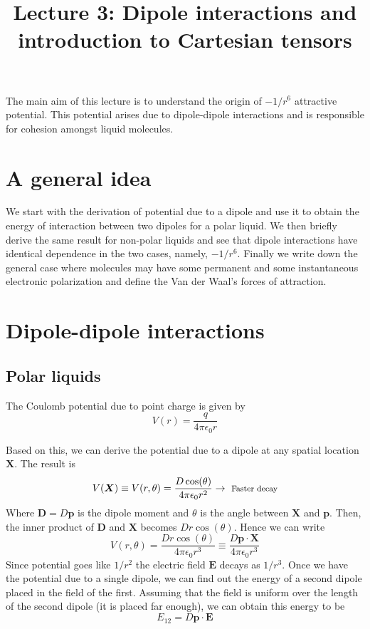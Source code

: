 \documentclass[11pt, letterpaper]{article}
\title{Lecture 3: Dipole interactions and introduction to Cartesian tensors}
\begin{document}
\maketitle

The main aim of this lecture is to understand the origin of $-1/r^6$ attractive potential. This potential arises due to dipole-dipole interactions and is responsible for cohesion amongst liquid molecules.

\section{A general idea}
We start with the derivation of potential due to a dipole and use it to obtain the energy of interaction between two dipoles for a polar liquid. We then briefly derive the same result for non-polar liquids and see that dipole interactions have identical dependence in the two cases, namely, $-1/r^6$. Finally we write down the general case where molecules may have some permanent and some instantaneous electronic polarization and define the Van der Waal's forces of attraction.

\section{Dipole-dipole interactions}
\subsection{Polar liquids}

The Coulomb potential due to point charge is given by 
$$
V(r)=\frac{q}{4\pi\epsilon_0 r}
$$

Based on this, we can derive the potential due to a dipole at any spatial location $\bm{X}$. The result is
$$
V(\bm{X})\equiv V({r,\theta}) =\frac{D \cos(\theta)}{4\pi\epsilon_0 r^2} \rightarrow\text{ \footnotesize{Faster decay}}
$$
Where $\bm{D}=D\bm{p}$ is the dipole moment and $\theta$ is the angle between $\bm{X}$ and $\bm{p}$. Then, the inner product of $\bm{D}$ and $\bm{X}$ becomes $D r \cos(\theta)$. Hence we can write
$$
V({r,\theta}) =\frac{D r \cos(\theta)}{4\pi\epsilon_0 r^3}\equiv\frac{D \bm{p}\cdot\bm{X}}{4\pi\epsilon_0 r^3}
$$
Since potential goes like $1/r^2$ the electric field $\bm{E}$ decays as $1/r^3$. Once we have the potential due to a single dipole, we can find out the energy of a second dipole placed in the field of the first. Assuming that the field is uniform over the length of the second dipole (it is placed far enough), we can obtain this energy to be 
$$
E_{12} = D\bm{p}\cdot\bm{E}
$$
\end{document}
